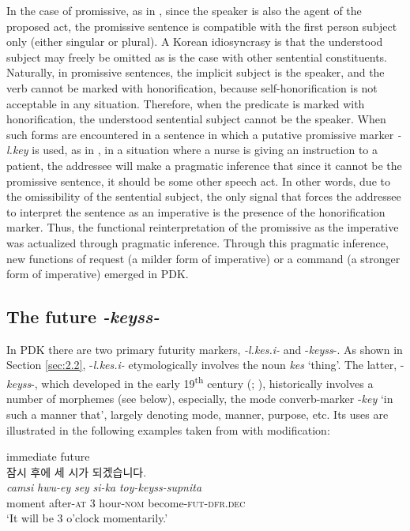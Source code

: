 \documentclass[output=paper,colorlinks,citecolor=brown]{langscibook}
\begin{document}
In the case of promissive, as in , since the speaker is also the agent of the proposed act, the promissive sentence is compatible with the first person subject only (either singular or plural). A Korean idiosyncrasy is that the understood subject may freely be omitted as is the case with other sentential constituents. Naturally, in promissive sentences, the implicit subject is the speaker, and the verb cannot be marked with honorification, because self-honorification is not acceptable in any situation. Therefore, when the predicate is marked with honorification, the understood sentential subject cannot be the speaker. When such forms are encountered in a sentence in which a putative promissive marker \textit{-l.key} is used, as in , in a situation where a nurse is giving an instruction to a patient, the addressee will make a pragmatic inference that since it cannot be the promissive sentence, it should be some other speech act. In other words, due to the omissibility of the sentential subject, the only signal that forces the addressee to interpret the sentence as an imperative is the presence of the honorification marker. Thus, the functional reinterpretation of the promissive as the imperative was actualized through pragmatic inference. Through this pragmatic inference, new functions of request (a milder form of imperative) or a command (a stronger form of imperative) emerged in PDK. 

\subsection{The future \textit{-keyss-}} \label{sec:2.3}
In PDK there are two primary futurity markers, \textit{-l.kes.i-} and -\textit{keyss}-. As shown in Section \ref{sec:2.2}, -\textit{l.kes.i-} etymologically involves the noun \textit{kes} ‘thing’. The latter, -\textit{keyss}-, which developed in the early 19\textsuperscript{th} century (\cite{Huh1987}; \cite{Rhee1996}), historically involves a number of morphemes (see below), especially, the mode converb-marker -\textit{key} ‘in such a manner that’, largely denoting mode, manner, purpose, etc. Its uses are illustrated in the following examples taken from \citet[67]{Lee2010} with modification:

\ea \label{ex:rhee:9}
\ea immediate future\\ \label{ex:rhee:9a}
\textkorean{잠시 후에 세 시가 되겠습니다}.\\
    \gll \textit{camsi} \textit{hwu-ey} \textit{sey} \textit{si-ka} \textit{toy-keyss-supnita}\\
         moment after-\textsc{at} 3 hour-\textsc{nom} become-\textsc{fut-dfr.dec}\\
    \glt ‘It will be 3 o’clock momentarily.’\\
\end{document}
